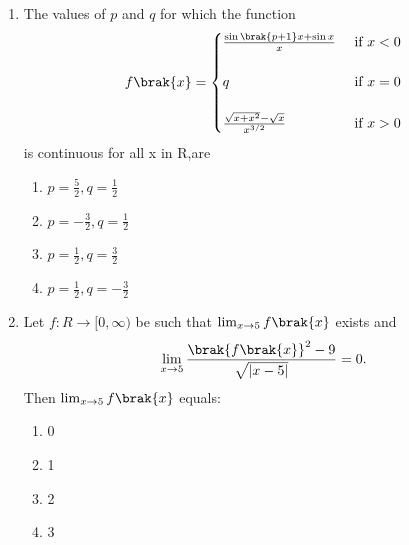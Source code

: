 \documentclass[journal,12pt,onecolumn]{IEEEtran}
\theoremstyle{remark}
\begin{document}
\begin{enumerate}
    \item The values of $p$ and $q$ for which the function 
     \[ f\brak{x} = \begin{cases}
  \frac{\sin\brak{p+1}x+\sin x}{x} & \text{ if $ x<0 $}\\\\
  q & \text{ if $ x = 0 $}\\\\
  \frac{\sqrt{x+x^2}-\sqrt{x}}{x^{3/2}} & \text{ if $ x> 0 $}
  \end{cases}
  \]
    is  continuous for all x in R,are \hfill{}
     \begin{multicols}{2}
         \begin{enumerate}
       \item $p=\frac{5}{2}, q =\frac{1}{2}$
       \item $p=-\frac{3}{2}, q=\frac{1}{2}$
       \item $p=\frac{1}{2}, q = \frac{3}{2}$
       \item $p=\frac{1}{2}, q = -\frac{3}{2}$
     \end{enumerate}
     \end{multicols}
     
    \item Let $f:R \to [0,\infty)$ be such that $\lim_{x\to 5} f\brak{x}$ exists and \[ \lim_{x\to 5} \frac{\brak{f\brak{x}}^2-9}{\sqrt{\lvert x-5\rvert}}=0.\]Then $ \lim_{x\to 5} f\brak{x}$ equals:
     \begin{multicols}{4}
         \begin{enumerate}
     \item 0\item1\item2\item3
     \end{enumerate}
     \end{multicols}
     

\end{enumerate}
\end{document}
